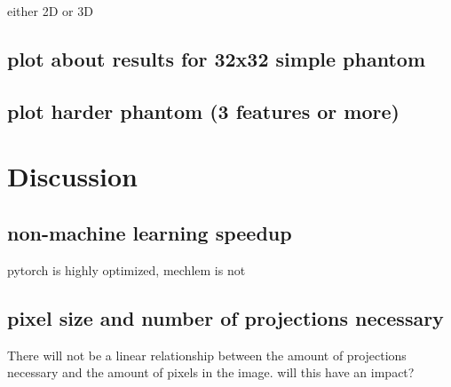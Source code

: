 \documentclass[9pt,Preprint]{lapreprint}
\begin{document}
either 2D or 3D

\subsection{plot about results for 32x32 simple phantom}

\subsection{plot harder phantom (3 features or more)}

\section{Discussion}

\subsection{non-machine learning speedup}

pytorch is highly optimized, mechlem is not

\subsection{pixel size and number of projections necessary}

There will not be a linear relationship between the amount of projections necessary and the amount of pixels in the image. will this have an impact?

\printbibliography

\if@endfloat\clearpage\processdelayedfloats\clearpage\fi



\end{document}
